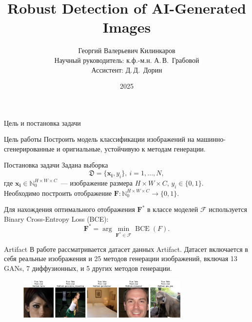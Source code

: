 \documentclass[aspectratio=169]{beamer}
\title[\hbox to 56mm{Краткое название}]{Robust Detection of AI-Generated Images}
\author[Г.\,В.~Килинкаров]{Георгий Валерьевич Килинкаров\\
\small Научный руководитель: к.ф.-м.н. А.\,В.~Грабовой \\
\small Ассистент: Д.\,Д.~Дорин}
\institute{Анализ данных ФПМИ МФТИ}
\date{2025}
\begin{document}
\begin{frame}
\thispagestyle{empty}
\maketitle
\end{frame}

\begin{frame}{Цель и постановка задачи}
\begin{block}{Цель работы}
    Построить модель классификации изображений на машинно-сгенерированные и оригиальные, устойчивую к методам генерации. 
\end{block}
\begin{block}{Постановка задачи}
Задана выборка $$\mathfrak{D} = \{\bm{x_i}, y_i \},\ i= 1, ..., N,$$ где $\bm{x_i} \in \mathbb{N}_0^{H \times W \times C}$~--- изображение размера $H \times W \times C$, $y_i \in \{ 0, 1\}.$ \\

Необходимо построить отображение $\bm{F}: \mathbb{N}_0^{H \times W \times C} \rightarrow \{ 0, 1 \}.$

Для нахождения оптимального отображения \( \bm{F}^* \) в классе моделей \( \mathcal{F} \) используется Binary Cross-Entropy Loss (BCE):
\[
	\bm{F}^* = \arg\min_{\bm{F}^* \in \mathcal{F}} \operatorname{BCE}(F).
\]
\end{block}
\end{frame}
\begin{frame}{Artifact}
В работе рассматривается датасет данных Artifact. Датасет включается в себя реальные изображения и 25 методов генерации изображений, включая 13 GANs, 7 диффузионных, и 5 других методов генерации. 
\begin{figure}
\centering
\includegraphics[width=0.76\textwidth]{figs/fake_images.png}
\end{figure}


\end{frame}
\end{document}
